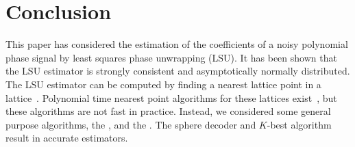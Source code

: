 \documentclass[journal]{IEEEtran}
\begin{document}




 
\section{Conclusion} \label{sec:conclusion}
 
This paper has considered the estimation of the coefficients of a noisy polynomial phase signal by least squares phase unwrapping (LSU). It has been shown that the LSU estimator is strongly consistent and asymptotically normally distributed. %
The LSU estimator can be computed by finding a nearest lattice point in a lattice~\cite{McKilliam2009asilomar_polyest_lattice}.  %
Polynomial time nearest point algorithms for these lattices exist~\cite[Sec 4.3]{McKilliam2010thesis}, but these algorithms are not fast in practice.  Instead, we considered some general purpose algorithms, the ,  and the . The sphere decoder and $K$-best algorithm result in accurate estimators.
\end{document}

